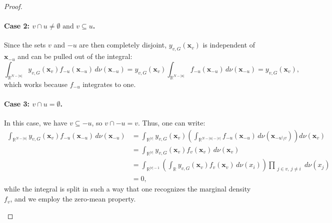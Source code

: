 \begin{proof}
\paragraph{Case 2: $v \cap u \ne \emptyset \text{ and } v \subseteq u$.}
Since the sets $v$ and $-u$ are then completely disjoint, $y_{v,G}(\boldsymbol{x}_v)$ is independent of $\boldsymbol{x}_{-u}$ and can be pulled out of the integral:
\[
\int_{\mathbb{R}^{N - |u|}} y_{v,G}(\boldsymbol{x}_v) f_{-u}(\boldsymbol{x}_{-u}) \, d \nu(\boldsymbol{x}_{-u})
= y_{v,G}(\boldsymbol{x}_v) \int_{\mathbb{R}^{N - |u|}} f_{-u}(\boldsymbol{x}_{-u}) \, d \nu(\boldsymbol{x}_{-u})
= y_{v,G}(\boldsymbol{x}_v),
\]
which works because $f_{-u}$ integrates to one.
\begin{center}
\end{center}
\paragraph{Case 3: \( v \cap u = \emptyset \).}
In this case, we have \( v \subseteq -u \), so \( v \cap -u = v \). Thus, one can write:
\[
\begin{aligned}
\int_{\mathbb{R}^{N - |u|}} y_{v,G}(\boldsymbol{x}_v) f_{-u}(\boldsymbol{x}_{-u}) \, d \nu(\boldsymbol{x}_{-u})
&= \int_{\mathbb{R}^{|v|}} y_{v,G}(\boldsymbol{x}_v)
\left( \int_{\mathbb{R}^{N - |u| - |v|}} f_{-u}(\boldsymbol{x}_{-u}) \, d \nu(\boldsymbol{x}_{-u \setminus v}) \right)
d \nu(\boldsymbol{x}_v) \\[3ex]
&= \int_{\mathbb{R}^{|v|}} y_{v,G}(\boldsymbol{x}_v) f_v(\boldsymbol{x}_v) \, d \nu(\boldsymbol{x}_v) \\[3ex]
&= \int_{\mathbb{R}^{|v|-1}} \left( \int_{\mathbb{R}} y_{v,G}(\boldsymbol{x}_v) f_v(\boldsymbol{x}_v) \, d \nu(x_i) \right)
\prod_{\substack{j \in v, \, j \ne i}} d \nu (x_j) \\
&= 0,
\end{aligned}
\]
while the integral is split in such a way that one recognizes the marginal density $f_v$, and we employ the zero-mean property.
\begin{center}
\end{center}
\end{proof}

